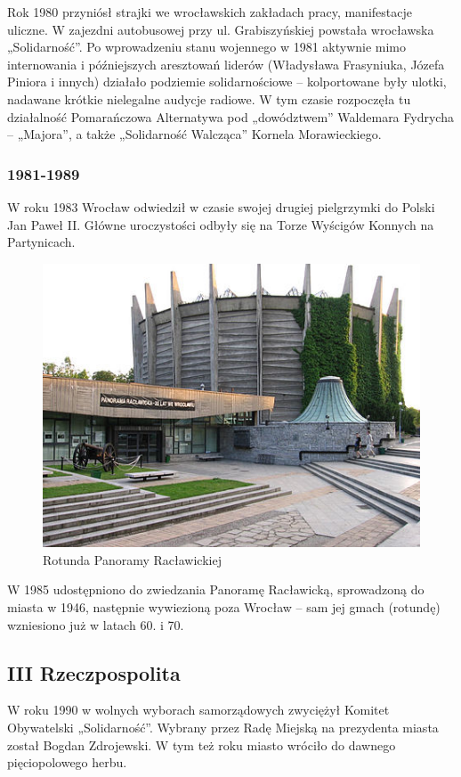 \documentclass{article}
\begin{document}
Rok 1980 przyniósł strajki we wrocławskich zakładach pracy, manifestacje uliczne. W zajezdni autobusowej przy ul. Grabiszyńskiej powstała wrocławska „Solidarność”. Po wprowadzeniu stanu wojennego w 1981 aktywnie mimo internowania i późniejszych aresztowań liderów (Władysława Frasyniuka, Józefa Piniora i innych) działało podziemie solidarnościowe – kolportowane były ulotki, nadawane krótkie nielegalne audycje radiowe. W tym czasie rozpoczęła tu działalność Pomarańczowa Alternatywa pod „dowództwem” Waldemara Fydrycha – „Majora”, a także „Solidarność Walcząca” Kornela Morawieckiego.

\subsubsection{1981-1989}
W roku 1983 Wrocław odwiedził w czasie swojej drugiej pielgrzymki do Polski Jan Paweł II. Główne uroczystości odbyły się na Torze Wyścigów Konnych na Partynicach.
 \begin{figure}[h!]
\centering
\includegraphics[scale=0.4]{19.jpg}
\caption{Rotunda Panoramy Racławickiej}
\end{figure}
W 1985 udostępniono do zwiedzania Panoramę Racławicką, sprowadzoną do miasta w 1946, następnie wywiezioną poza Wrocław – sam jej gmach (rotundę) wzniesiono już w latach 60. i 70.

\subsection{III Rzeczpospolita}
W roku 1990 w wolnych wyborach samorządowych zwyciężył Komitet Obywatelski „Solidarność”. Wybrany przez Radę Miejską na prezydenta miasta został Bogdan Zdrojewski. W tym też roku miasto wróciło do dawnego pięciopolowego herbu.
\end{document}
